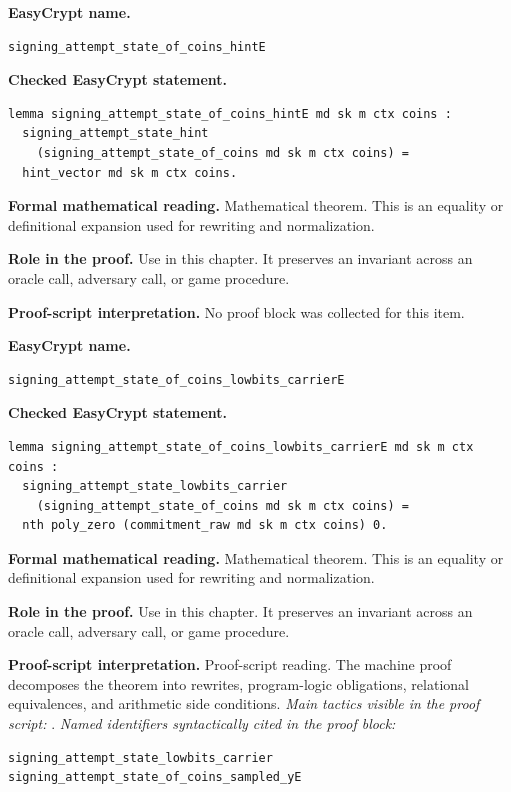 \begin{formaltheorem}
\noindent\textbf{EasyCrypt name.}
\begin{lstlisting}[language=EasyCrypt,basicstyle=\ttfamily\scriptsize]
signing_attempt_state_of_coins_hintE
\end{lstlisting}
\noindent\textbf{Checked EasyCrypt statement.}
\begin{lstlisting}[language=EasyCrypt,basicstyle=\ttfamily\scriptsize]
lemma signing_attempt_state_of_coins_hintE md sk m ctx coins :
  signing_attempt_state_hint
    (signing_attempt_state_of_coins md sk m ctx coins) =
  hint_vector md sk m ctx coins.
\end{lstlisting}
\noindent\textbf{Formal mathematical reading.}
Mathematical theorem. This is an equality or definitional expansion used for rewriting and normalization.

\noindent\textbf{Role in the proof.}
Use in this chapter. It preserves an invariant across an oracle call, adversary call, or game procedure.

\noindent\textbf{Proof-script interpretation.}
No proof block was collected for this item.

\end{formaltheorem}

\begin{formaltheorem}
\noindent\textbf{EasyCrypt name.}
\begin{lstlisting}[language=EasyCrypt,basicstyle=\ttfamily\scriptsize]
signing_attempt_state_of_coins_lowbits_carrierE
\end{lstlisting}
\noindent\textbf{Checked EasyCrypt statement.}
\begin{lstlisting}[language=EasyCrypt,basicstyle=\ttfamily\scriptsize]
lemma signing_attempt_state_of_coins_lowbits_carrierE md sk m ctx coins :
  signing_attempt_state_lowbits_carrier
    (signing_attempt_state_of_coins md sk m ctx coins) =
  nth poly_zero (commitment_raw md sk m ctx coins) 0.
\end{lstlisting}
\noindent\textbf{Formal mathematical reading.}
Mathematical theorem. This is an equality or definitional expansion used for rewriting and normalization.

\noindent\textbf{Role in the proof.}
Use in this chapter. It preserves an invariant across an oracle call, adversary call, or game procedure.

\noindent\textbf{Proof-script interpretation.}
Proof-script reading. The machine proof decomposes the theorem into rewrites, program-logic obligations, relational equivalences, and arithmetic side conditions.
\emph{Main tactics visible in the proof script:} .
\emph{Named identifiers syntactically cited in the proof block:}
\begin{lstlisting}[language=EasyCrypt,basicstyle=\ttfamily\scriptsize]
signing_attempt_state_lowbits_carrier
signing_attempt_state_of_coins_sampled_yE
\end{lstlisting}

\end{formaltheorem}

